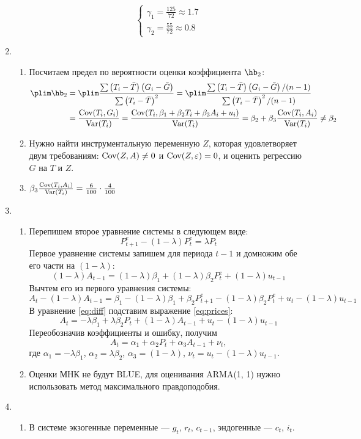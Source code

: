 \documentclass[12pt, a4paper]{article}
\theoremstyle{definition}
\begin{document}
\begin{enumerate}
\begin{enumerate}
\[\begin{cases}
\gamma_1 = \frac{125}{72} \approx 1.7 \\
\gamma_2 = \frac{55}{72} \approx 0.8
\end{cases}
\]
\end{enumerate}
\item
\begin{enumerate}
\item Посчитаем предел по вероятности оценки коэффициента $\hb_2$:
\begin{align*}
\plim \hb_2 &= \plim \frac{\sum \left(T_i - \bar T\right)\left(G_i - \bar G\right)}{\sum \left(T_i - \bar T\right)^2} = \plim \frac{\sum \left(T_i - \bar T\right)\left(G_i - \bar G\right)/(n-1)}{\sum \left(T_i - \bar T\right)^2/(n-1)} \\
&= \frac{\Cov(T_i, G_i)}{\Var(T_i)} = \frac{\Cov(T_i, \beta_1 + \beta_2 T_i + \beta_3 A_i + u_i)}{\Var(T_i)}  = \beta_2 + \beta_3 \frac{\Cov(T_i, A_i)}{\Var(T_i)} \neq \beta_2
\end{align*}
\item Нужно найти инструментальную переменную $Z$, которая удовлетворяет
двум требованиям: $\operatorname{Cov}(Z, A) \neq 0$ и $\operatorname{Cov}(Z, \varepsilon) = 0$,
и оценить регрессию $G$ на $T$ и $Z$.
\item $\beta_3 \frac{\operatorname{Cov}(T_i, A_i)}{\operatorname{Var}(T_i)} = \frac{6}{100} \cdot \frac{4}{100}$
\end{enumerate}
\item
\begin{enumerate}
\item Перепишем второе уравнение системы в следующем виде:
\begin{equation}\label{eq:prices}
P^e_{t+1} - (1 - \lambda) P^e_t = \lambda P_t
\end{equation}
Первое уравнение системы запишем для периода $t-1$ и домножим обе его части на $(1 - \lambda)$:
\[
(1 - \lambda) A_{t-1} = (1 - \lambda) \beta_1 + (1 - \lambda) \beta_2 P^e_t + (1 - \lambda) u_{t-1}
\]
Вычтем его из первого уравнения системы:
\begin{equation}\label{eq:diff}
A_t - (1 - \lambda) A_{t-1} = \beta_1 - (1 - \lambda) \beta_1 + \beta_2 P^e_{t+1} - (1 - \lambda) \beta_2 P^e_t + u_t - (1 - \lambda) u_{t-1}
\end{equation}
В уравнение \eqref{eq:diff} подставим выражение \eqref{eq:prices}:
\[
A_t = -\lambda \beta_1 + \lambda \beta_2 P_t + (1 - \lambda) A_{t-1} + u_t - (1 - \lambda) u_{t-1}
\]
Переобозначив коэффициенты и ошибку, получим
\[
A_t = \alpha_1 + \alpha_2 P_t + \alpha_3 A_{t-1} + \nu_t,
\]
где $\alpha_1 = -\lambda \beta_1$, $\alpha_2 = \lambda \beta_2$, $\alpha_3 =  (1 - \lambda)$,
$\nu_t = u_t - (1 - \lambda) u_{t-1}$.
\item Оценки МНК не будут BLUE, для оценивания ARMA(1, 1) нужно использовать
метод максимального правдоподобия.
\end{enumerate}
\item
\begin{enumerate}
\item В системе экзогенные переменные — $g_t$, $r_t$, $c_{t-1}$, эндогенные —
$c_t$, $i_t$.


\end{enumerate}
\end{enumerate}
\end{document}
